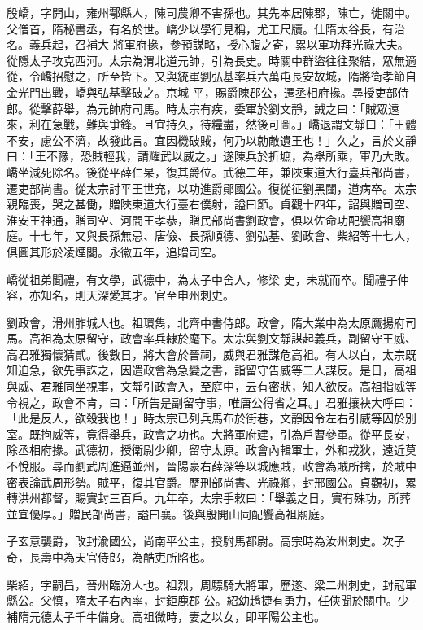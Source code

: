 \begin{pinyinscope}
 殷嶠，字開山，雍州鄠縣人，陳司農卿不害孫也。其先本居陳郡，陳亡，徙關中。父僧首，隋秘書丞，有名於世。嶠少以學行見稱，尤工尺牘。仕隋太谷長，有治名。義兵起，召補大
 將軍府掾，參預謀略，授心腹之寄，累以軍功拜光祿大夫。從隱太子攻克西河。太宗為渭北道元帥，引為長史。時關中群盜往往聚結，眾無適從，令嶠招慰之，所至皆下。又與統軍劉弘基率兵六萬屯長安故城，隋將衛孝節自金光門出戰，嶠與弘基擊破之。京城
 平，賜爵陳郡公，遷丞相府掾。尋授吏部侍郎。從擊薛舉，為元帥府司馬。時太宗有疾，委軍於劉文靜，誡之曰：「賊眾遠來，利在急戰，難與爭鋒。且宜持久，待糧盡，然後可圖。」嶠退謂文靜曰：「王體不安，慮公不濟，故發此言。宜因機破賊，何乃以勍敵遺王也！」久之，言於文靜曰：「王不豫，恐賊輕我，請耀武以威之。」遂陳兵於折墌，為舉所乘，軍乃大敗。嶠坐減死除名。後從平薛仁杲，復其爵位。武德二年，兼陜東道大行臺兵部尚書，遷吏部尚書。從太宗討平王世充，以功進爵鄖國公。復從征劉黑闥，道病卒。太宗親臨喪，哭之甚慟，贈陜東道大行臺右僕射，謚曰節。貞觀十四年，詔與贈司空、淮安王神通，贈司空、河間王孝恭，贈民部尚書劉政會，俱以佐命功配饗高祖廟庭。十七年，又與長孫無忌、唐儉、長孫順德、劉弘基、劉政會、柴紹等十七人，俱圖其形於凌煙閣。永徽五年，追贈司空。



 嶠從祖弟聞禮，有文學，武德中，為太子中舍人，修梁
 史，未就而卒。聞禮子仲容，亦知名，則天深愛其才。官至申州刺史。



 劉政會，滑州胙城人也。祖環雋，北齊中書侍郎。政會，隋大業中為太原鷹揚府司馬。高祖為太原留守，政會率兵隸於麾下。太宗與劉文靜謀起義兵，副留守王威、高君雅獨懷猜貳。後數日，將大會於晉祠，威與君雅謀危高祖。有人以白，太宗既知迫急，欲先事誅之，因遣政會為急變之書，詣留守告威等二人謀反。是日，高祖與威、君雅同坐視事，文靜引政會入，至庭中，云有密狀，知人欲反。高祖指威等令視之，政會不肯，曰：「所告是副留守事，唯唐公得省之耳。」君雅攘袂大呼曰：「此是反人，欲殺我也！」時太宗已列兵馬布於街巷，文靜因令左右引威等囚於別室。既拘威等，竟得舉兵，政會之功也。大將軍府建，引為戶曹參軍。從平長安，除丞相府掾。武德初，授衛尉少卿，留守太原。政會內輯軍士，外和戎狄，遠近莫不悅服。尋而劉武周進逼並州，晉陽豪右薛深等以城應賊，政會為賊所擒，於賊中密表論武周形勢。賊平，復其官爵。歷刑部尚書、光祿卿，封邢國公。貞觀初，累轉洪州都督，賜實封三百戶。九年卒，太宗手敕曰：「舉義之日，實有殊功，所葬並宜優厚。」贈民部尚書，謚曰襄。後與殷開山同配饗高祖廟庭。



 子玄意襲爵，改封渝國公，尚南平公主，授駙馬都尉。高宗時為汝州刺史。次子奇，長壽中為天官侍郎，為酷吏所陷也。



 柴紹，字嗣昌，晉州臨汾人也。祖烈，周驃騎大將軍，歷遂、梁二州刺史，封冠軍縣公。父慎，隋太子右內率，封鉅鹿郡
 公。紹幼趫捷有勇力，任俠聞於關中。少補隋元德太子千牛備身。高祖微時，妻之以女，即平陽公主也。




\end{pinyinscope}
